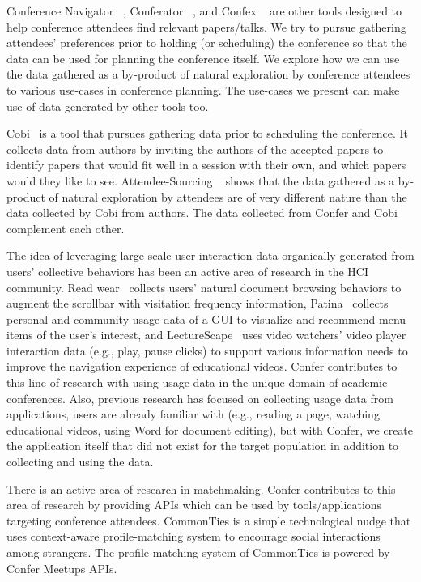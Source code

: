 \documentclass{sigchi}
\begin{document}
Conference Navigator ~\cite{ConferenceNavigator}, Conferator ~\cite{ConferenceAnatomy}, and Confex ~\cite{Confex} are other tools designed to help conference attendees find relevant papers/talks. We try to pursue gathering attendees' preferences prior to holding (or scheduling) the conference so that the data can be used for planning the conference itself. We explore how we can use the data gathered as a by-product of natural exploration by conference attendees to various use-cases in conference planning. The use-cases we present can make use of data generated by other tools too.

Cobi~\cite{CobiUIST2013} is a tool that pursues gathering data prior to scheduling the conference. It collects data from authors by inviting the authors of the accepted papers to identify papers that would fit well in a session with their own, and which papers would they like to see. Attendee-Sourcing ~\cite{AttendeeSourcingHCOMP14} shows that the data gathered as a by-product of natural exploration by attendees are of very different nature than the data collected by Cobi from authors. The data collected from Confer and Cobi complement each other.

The idea of leveraging large-scale user interaction data organically generated from users' collective behaviors has been an active area of research in the HCI community. Read wear~\cite{Hill:1992:EWR:142750.142751} collects users' natural document browsing behaviors to augment the scrollbar with visitation frequency information, Patina~\cite{patina} collects personal and community usage data of a GUI to visualize and recommend menu items of the user's interest, and LectureScape~\cite{lecturescape} uses video watchers' video player interaction data (e.g., play, pause clicks) to support various information needs to improve the navigation experience of educational videos. Confer contributes to this line of research with using usage data in the unique domain of academic conferences. Also, previous research has focused on collecting usage data from applications, users are already familiar with (e.g., reading a page, watching educational videos, using Word for document editing), but with Confer, we create the application itself that did not exist for the target population in addition to collecting and using the data.

There is an active area of research in matchmaking. Confer contributes to this area of research by providing APIs which can be used by tools/applications targeting conference attendees. CommonTies \cite{Abouzied:2014:CCN:2556420.2556783} is a simple technological nudge that uses context-aware profile-matching system to encourage social interactions among strangers. The profile matching system of CommonTies is powered by Confer Meetups APIs.
\end{document}
